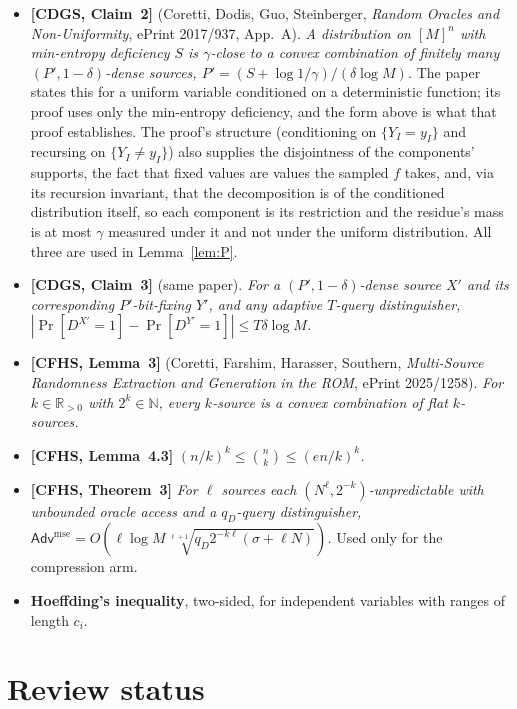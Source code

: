 \documentclass{aicr-solution}
\newcommand{\Adv}{\mathsf{Adv}}
\newcommand{\Prob}[1]{\Pr\!\left[#1\right]}
\begin{document}
\begin{itemize}
\item \textbf{[CDGS, Claim~2]} (Coretti, Dodis, Guo, Steinberger, \emph{Random
  Oracles and Non-Uniformity}, ePrint 2017/937, App.~A). \emph{A distribution on
  $[M]^{n}$ with min-entropy deficiency $S$ is $\gamma$-close to a convex
  combination of finitely many $(P',1-\delta)$-dense sources,
  $P'=(S+\log1/\gamma)/(\delta\log M)$.} The paper states this for a uniform
  variable conditioned on a deterministic function; its proof uses only the
  min-entropy deficiency, and the form above is what that proof establishes. The
  proof's structure (conditioning on $\{Y_I=y_I\}$ and recursing on
  $\{Y_I\ne y_I\}$) also supplies the disjointness of the components'
  supports, the fact that fixed values are values the sampled $f$ takes, and,
  via its recursion invariant, that the decomposition is of the conditioned
  distribution itself, so each component is its restriction and the residue's
  mass is at most $\gamma$ measured under it and not under the uniform
  distribution. All three are used in Lemma~\ref{lem:P}.
\item \textbf{[CDGS, Claim~3]} (same paper). \emph{For a $(P',1-\delta)$-dense
  source $X'$ and its corresponding $P'$-bit-fixing $Y'$, and any adaptive
  $T$-query distinguisher, $|\Prob{D^{X'}=1}-\Prob{D^{Y'}=1}|\le T\delta\log M$.}
\item \textbf{[CFHS, Lemma~3]} (Coretti, Farshim, Harasser, Southern,
  \emph{Multi-Source Randomness Extraction and Generation in the ROM}, ePrint
  2025/1258). \emph{For $k\in\mathbb R_{>0}$ with $2^{k}\in\mathbb N$, every
  $k$-source is a convex combination of flat $k$-sources.}
\item \textbf{[CFHS, Lemma~4.3]} \emph{$(n/k)^{k}\le\binom nk\le(en/k)^{k}$.}
\item \textbf{[CFHS, Theorem~3]} \emph{For $\ell$ sources each
  $(N^{\ell},2^{-k})$-unpredictable with unbounded oracle access and a
  $q_D$-query distinguisher,
  $\Adv^{\mathrm{mse}}=O(\ell\log M\sqrt[\ell+1]{q_D2^{-k\ell}(\sigma+\ell N)})$.}
  Used only for the compression arm.
\item \textbf{Hoeffding's inequality}, two-sided, for independent variables with
  ranges of length $c_i$.
\end{itemize}

\section{Review status}\label{sec:review}
\end{document}
